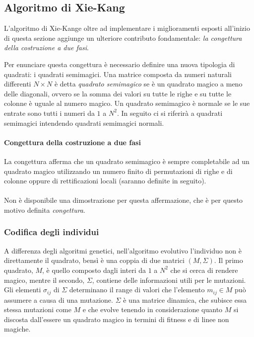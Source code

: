 \documentclass[italian,twoside,twocolumn]{article}
\begin{document}
\subsection{Algoritmo di Xie-Kang}

L'algoritmo di Xie-Kange oltre ad implementare i miglioramenti esposti all'inizio di questa sezione aggiunge un ulteriore contributo fondamentale: \emph{la congettura della costruzione a due fasi}. 

Per enunciare questa congettura è necessario definire una nuova tipologia di quadrati: i quadrati semimagici. Una matrice composta da numeri naturali differenti $ N\times N $ è detta \emph{quadrato semimagico} se è un quadrato magico a meno delle diagonali, ovvero se la somma dei valori su tutte le righe e su tutte le colonne è uguale al numero magico. Un quadrato semimagico è normale se le sue entrate sono tutti i numeri da $ 1 $ a $ N^2 $. In seguito ci si riferirà a quadrati semimagici intendendo quadrati semimagici normali. 

\paragraph{Congettura della costruzione a due fasi} La congettura afferma che un quadrato semimagico è sempre completabile ad un quadrato magico utilizzando un numero finito di permutazioni di righe e di colonne oppure di rettificazioni locali (saranno definite in seguito). 
\\ \\
Non è disponibile una dimostrazione per questa affermazione, che è per questo motivo definita \emph{congettura}.

\subsubsection{Codifica degli individui}
A differenza degli algoritmi genetici, nell'algoritmo evolutivo l'individuo non è direttamente il quadrato, bensì è una coppia di due matrici $ \left(M, \Sigma \right) $. Il primo quadrato, $ M $, è quello composto dagli interi da $ 1 $ a $ N^2 $ che si cerca di rendere magico, mentre il secondo, $ \Sigma $, contiene delle informazioni utili per le mutazioni. Gli elementi $ \sigma_{ij} $ di $ \Sigma $ determinano il range di valori che l'elemento $ m_{ij} \in M $ può assumere a causa di una mutazione. $ \Sigma $ è una matrice dinamica, che subisce essa stessa mutazioni come $ M $ e che evolve tenendo in considerazione quanto $ M $ si discosta dall'essere un quadrato magico in termini di fitness e di linee non magiche.
\end{document}
